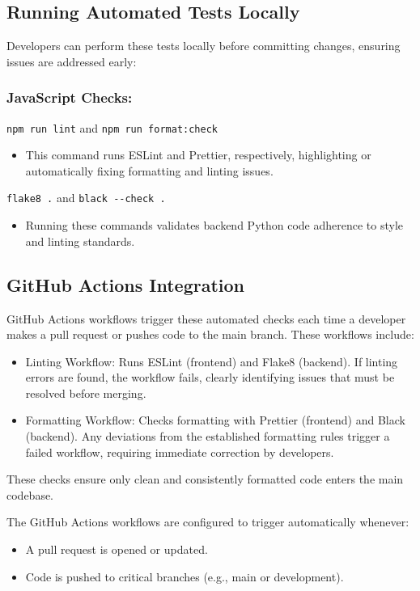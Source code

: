 \documentclass[12pt, titlepage]{article}
\begin{document}
\subsection{Running Automated Tests Locally}
Developers can perform these tests locally before committing changes, ensuring issues are addressed early:

\subsubsection{JavaScript Checks:}
\verb|npm run lint| and \verb|npm run format:check|
\begin{itemize}
\item This command runs ESLint and Prettier, respectively, highlighting or automatically fixing formatting and linting issues.
\end{itemize}

\verb|flake8 .| and \verb|black --check .|
\begin{itemize}
\item Running these commands validates backend Python code adherence to style and linting standards.
\end{itemize}

\subsection{GitHub Actions Integration}
GitHub Actions workflows trigger these automated checks each time a developer makes a pull request or pushes code to the main branch. These workflows include:
\begin{itemize}
\item Linting Workflow: Runs ESLint (frontend) and Flake8 (backend). If linting errors are found, the workflow fails, clearly identifying issues that must be resolved before merging.
\item Formatting Workflow: Checks formatting with Prettier (frontend) and Black (backend). Any deviations from the established formatting rules trigger a failed workflow, requiring immediate correction by developers.
\end{itemize}

These checks ensure only clean and consistently formatted code enters the main codebase.

The GitHub Actions workflows are configured to trigger automatically whenever:
\begin{itemize}
\item A pull request is opened or updated.
\item Code is pushed to critical branches (e.g., main or development).
\end{itemize}
\end{document}

